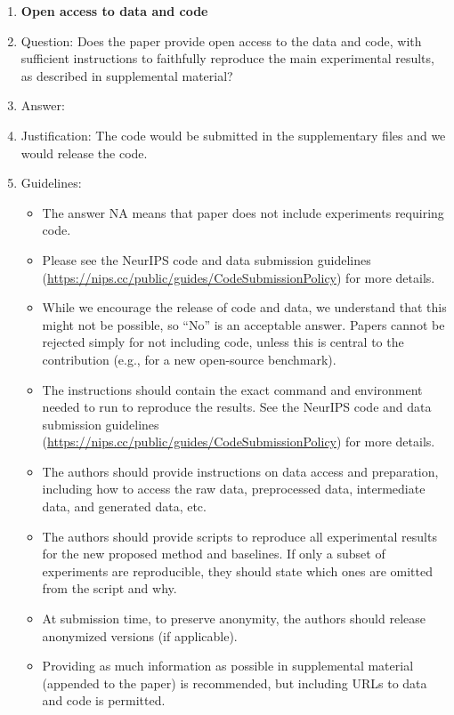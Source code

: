 \documentclass{article}
\begin{document}
\begin{enumerate}
\item {\bf Open access to data and code}
    \item[] Question: Does the paper provide open access to the data and code, with sufficient instructions to faithfully reproduce the main experimental results, as described in supplemental material?
    \item[] Answer: \answerYes{} %
    \item[] Justification: The code would be submitted in the supplementary files and we would release the code.
    \item[] Guidelines:
    \begin{itemize}
        \item The answer NA means that paper does not include experiments requiring code.
        \item Please see the NeurIPS code and data submission guidelines (\url{https://nips.cc/public/guides/CodeSubmissionPolicy}) for more details.
        \item While we encourage the release of code and data, we understand that this might not be possible, so “No” is an acceptable answer. Papers cannot be rejected simply for not including code, unless this is central to the contribution (e.g., for a new open-source benchmark).
        \item The instructions should contain the exact command and environment needed to run to reproduce the results. See the NeurIPS code and data submission guidelines (\url{https://nips.cc/public/guides/CodeSubmissionPolicy}) for more details.
        \item The authors should provide instructions on data access and preparation, including how to access the raw data, preprocessed data, intermediate data, and generated data, etc.
        \item The authors should provide scripts to reproduce all experimental results for the new proposed method and baselines. If only a subset of experiments are reproducible, they should state which ones are omitted from the script and why.
        \item At submission time, to preserve anonymity, the authors should release anonymized versions (if applicable).
        \item Providing as much information as possible in supplemental material (appended to the paper) is recommended, but including URLs to data and code is permitted.
    \end{itemize}



\end{enumerate}
\end{document}
